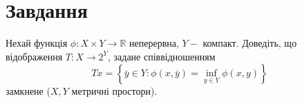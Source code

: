 
\chapter{Завдання \theHchapter}

\begin{tcolorbox}[title=Завдання]
    Нехай функція $\phi: X \times Y \rightarrow \mathbb{R}$ неперервна, 
    $Y-$ компакт. 
    Доведіть, що відображення $T: X \rightarrow 2^{Y}$, 
    задане співвідношенням
    $$T x=\left\{\bar{y} \in Y: \phi(x, \bar{y})=
    \inf _{y \in Y} \phi(x, y)\right\}$$
    замкнене ($X, Y$ метричні простори).
\end{tcolorbox}



